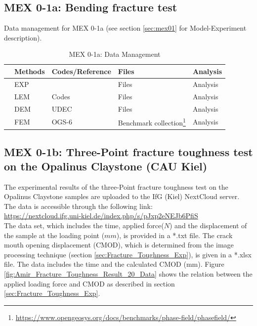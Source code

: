 \subsection{MEX 0-1a: Bending fracture test}

Data management for MEX 0-1a (see section \ref{sec:mex01} for Model-Experiment description).


\begin{table}[h!]
\footnotesize
\centering
\caption{MEX 0-1a: Data Management}
\label{tab:schedule}
\begin{tabular}{|L{0.5cm}|L{1cm}|L{2cm}|L{3cm}|L{1cm}|} 
\hline
 & Methods & Codes/Reference & Files & Analysis \\ \hline
 & EXP & \cite{} & Files & Analysis \\ \hline
 & LEM & Codes & Files & Analysis \\ \hline
 & DEM & UDEC & Files & Analysis \\ \hline
 & FEM & OGS-6 & Benchmark collection\footnote{\url{https://www.opengeosys.org/docs/benchmarks/phase-field/phasefield/}} & Analysis \\ \hline
\end{tabular}
\end{table}
\normalsize

\subsection{MEX 0-1b: Three-Point fracture toughness test on the Opalinus Claystone (CAU Kiel)}

The experimental results of the three-Point fracture toughness test on the Opalinus Claystone samples are uploaded to the IfG (Kiel) NextCloud server. The data is accessible through the following link:\\
\hyperlink{https://nextcloud.ifg.uni-kiel.de/index.php/s/pJxp2eNEJb6PfiS}{https://nextcloud.ifg.uni-kiel.de/index.php/s/pJxp2eNEJb6PfiS}\\

The data set, which includes the time, applied force($N$) and the displacement of the sample at the loading point ($mm$), is provided in a *.txt file. The crack mouth opening displacement (CMOD), which is determined from the image processing technique (section \ref {sec:Fracture_Toughness_Exp}), is given in a *.xlsx file. The data includes the time and the calculated CMOD (mm). Figure \ref{fig:Amir_Fracture_Toughness_Result_20_Data} shows the relation between the applied loading force and CMOD as described in section \ref {sec:Fracture_Toughness_Exp}.

